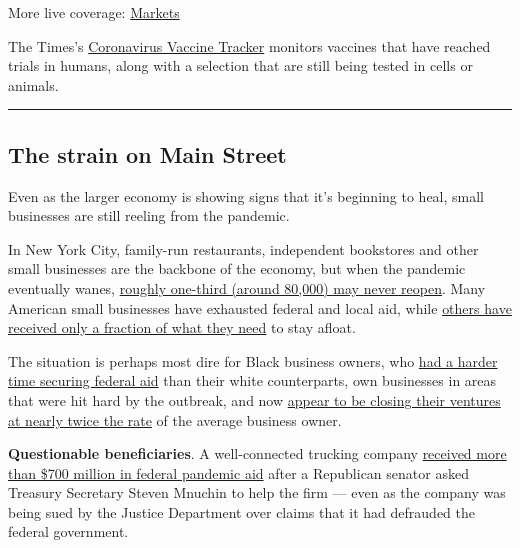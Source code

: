 More live coverage:
\href{https://www.nytimes.com/live/2020/08/04/business/stock-market-today-coronavirus?action=click\&pgtype=Article\&state=default\&region=MAIN_CONTENT_1\&context=storylines_live_updates}{Markets}

The Times's
\href{https://www.nytimes.com/interactive/2020/science/coronavirus-vaccine-tracker.html}{Coronavirus
Vaccine Tracker} monitors vaccines that have reached trials in humans,
along with a selection that are still being tested in cells or animals.

\begin{center}\rule{0.5\linewidth}{\linethickness}\end{center}

\hypertarget{the-strain-on-main-street}{%
\subsection{The strain on Main Street}\label{the-strain-on-main-street}}

Even as the larger economy is showing signs that it's beginning to heal,
small businesses are still reeling from the pandemic.

In New York City, family-run restaurants, independent bookstores and
other small businesses are the backbone of the economy, but when the
pandemic eventually wanes,
\href{https://www.nytimes.com/2020/08/03/nyregion/nyc-small-businesses-closing-coronavirus.html}{roughly
one-third (around 80,000) may never reopen}. Many American small
businesses have exhausted federal and local aid, while
\href{https://www.nytimes.com/2020/08/03/business/small-business-loans-coronavirus.html?action=click\&module=RelatedLinks\&pgtype=Article}{others
have received only a fraction of what they need} to stay afloat.

The situation is perhaps most dire for Black business owners, who
\href{https://www.nytimes.com/2020/07/15/business/paycheck-protection-program-bias.html}{had
a harder time securing federal aid} than their white counterparts, own
businesses in areas that were hit hard by the outbreak, and now
\href{https://www.nytimes.com/live/2020/08/04/business/stock-market-today-coronavirus\#black-owned-businesses-face-a-double-blow-as-the-pandemic-strikes-minority-communities}{appear
to be closing their ventures at nearly twice the rate} of the average
business owner.

\textbf{Questionable beneficiaries}. A well-connected trucking company
\href{https://www.nytimes.com/2020/08/03/us/politics/yrc-coronavirus-relief-funds.html}{received
more than \$700 million in federal pandemic aid} after a Republican
senator asked Treasury Secretary Steven Mnuchin to help the firm ---
even as the company was being sued by the Justice Department over claims
that it had defrauded the federal government.

